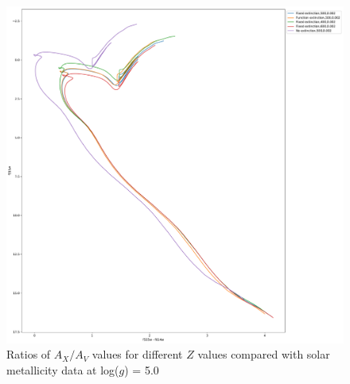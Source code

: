 \documentclass[12pt, a4paper]{report}
\begin{document}
\begin{figure}[h]
\begin{center}
\includegraphics[scale=0.3]{../basti_isochrones_10_13Gyr/Extinction_T50k_FeH0fix_func_f555w_f555wmf814w_500_400_600_Myr_FeH_0p002_ref_noext_Av_1p0.pdf}
\caption{Ratios of $A_{X}/A_{V}$ values for different $Z$ values compared with solar metallicity data at log($g$) = 5.0}
\label{wfc3_isoc1_T50k}
\end{center}
\end{figure}
\end{document}
